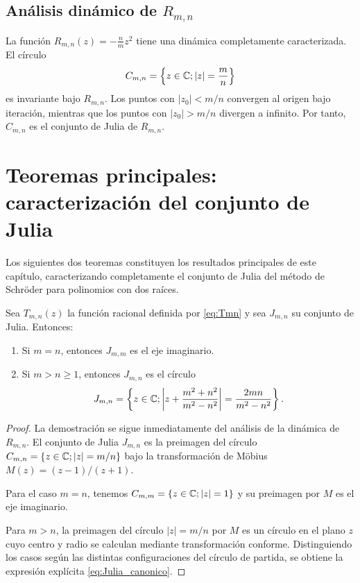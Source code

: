 \subsection{Análisis dinámico de $R_{m,n}$}

La función $R_{m,n}(z)=-\tfrac{n}{m}z^2$ tiene una dinámica completamente caracterizada. El círculo
$$
C_{m,n}=\left\{z\in\mathbb{C}; |z|=\frac{m}{n}\right\}
$$
es invariante bajo $R_{m,n}$. Los puntos con $|z_0|<m/n$ convergen al origen bajo iteración, mientras que los puntos con $|z_0|>m/n$ divergen a infinito. Por tanto, $C_{m,n}$ es el conjunto de Julia de $R_{m,n}$.

\section{Teoremas principales: caracterización del conjunto de Julia}

Los siguientes dos teoremas constituyen los resultados principales de este capítulo, caracterizando completamente el conjunto de Julia del método de Schröder para polinomios con dos raíces.

\begin{teorema}
\label{teo:julia_canonico}
Sea $T_{m,n}(z)$ la función racional definida por \eqref{eq:Tmn} y sea $J_{m,n}$ su conjunto de Julia. Entonces:
\begin{enumerate}
\item Si $m=n$, entonces $J_{m,m}$ es el eje imaginario.
\item Si $m>n\ge 1$, entonces $J_{m,n}$ es el círculo
\begin{equation}
J_{m,n}=\left\{z\in\mathbb{C}; \left|z+\frac{m^2+n^2}{m^2-n^2}\right|=\frac{2mn}{m^2-n^2}\right\}.
\label{eq:Julia_canonico}
\end{equation}
\end{enumerate}
\end{teorema}

\begin{proof}
La demostración se sigue inmediatamente del análisis de la dinámica de $R_{m,n}$. El conjunto de Julia $J_{m,n}$ es la preimagen del círculo $C_{m,n}=\{z\in\mathbb{C}; |z|=m/n\}$ bajo la transformación de Möbius $M(z)=(z-1)/(z+1)$.

Para el caso $m=n$, tenemos $C_{m,m}=\{z\in\mathbb{C}; |z|=1\}$ y su preimagen por $M$ es el eje imaginario.

Para $m>n$, la preimagen del círculo $|z|=m/n$ por $M$ es un círculo en el plano $z$ cuyo centro y radio se calculan mediante transformación conforme. Distinguiendo los casos según las distintas configuraciones del círculo de partida, se obtiene la expresión explícita \eqref{eq:Julia_canonico}.
\end{proof}

